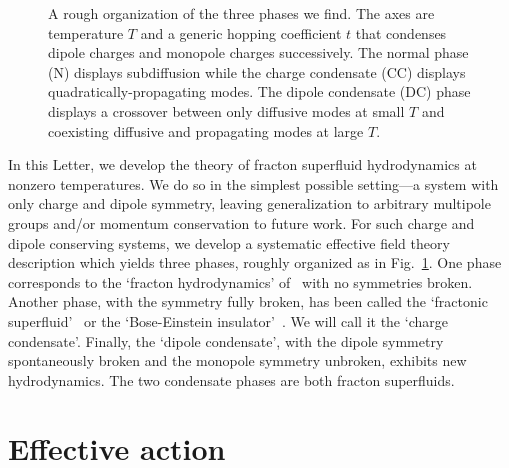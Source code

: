\begin{figure}
    \centering
{}
    \caption[A rough organization of the three hydrodynamic phases]{A rough organization of the three phases we find. The axes are temperature $T$ and a generic hopping coefficient $t$ that condenses dipole charges and monopole charges successively. The normal phase (N) displays subdiffusion while the charge condensate (CC) displays quadratically-propagating modes. The dipole condensate (DC) phase displays a crossover between only diffusive modes at small $T$ and coexisting diffusive and propagating modes at large $T$.}
    \label{fig:phasediagram}
\end{figure}

In this Letter, we develop the theory of fracton superfluid hydrodynamics at nonzero temperatures. We do so in the simplest possible setting---a system with only charge and dipole symmetry, leaving generalization to arbitrary multipole groups and/or momentum conservation to future work. 
For such charge and dipole conserving systems, we develop a systematic effective field theory description which yields three phases, roughly organized as in Fig.~\ref{fig:phasediagram}. One phase corresponds to the `fracton hydrodynamics' of~\cite{Gromov2020Fracton} with no symmetries broken. Another phase, with the symmetry fully broken, has been called the `fractonic superfluid'~\cite{Yuan2020Fractonic} or the `Bose-Einstein insulator'~\cite{Lake2022Dipolar}. We will call it the `charge condensate'. Finally, the `dipole condensate', with the dipole symmetry spontaneously broken and the monopole symmetry unbroken, exhibits new hydrodynamics. The two condensate phases are both fracton superfluids.

\section{Effective action}


